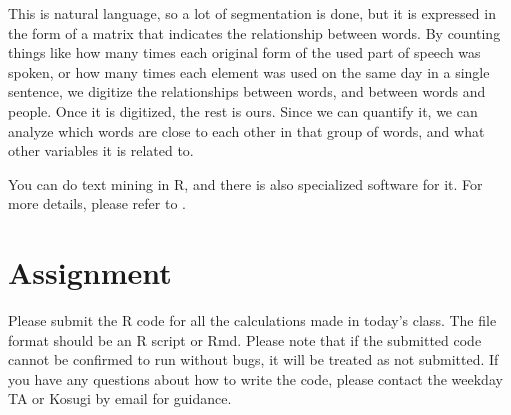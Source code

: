 \documentclass{ltjsbook}
\begin{document}
This is natural language, so a lot of segmentation is done, but it is expressed in the form of a matrix that indicates the relationship between words. By counting things like how many times each original form of the used part of speech was spoken, or how many times each element was used on the same day in a single sentence, we digitize the relationships between words, and between words and people.
Once it is digitized, the rest is ours. Since we can quantify it, we can analyze which words are close to each other in that group of words, and what other variables it is related to.

You can do text mining in R, and there is also specialized software for it. For more details, please refer to \textcite{Higuchu20200406}.


\section{Assignment}
Please submit the R code for all the calculations made in today's class. The file format should be an R script or Rmd. Please note that if the submitted code cannot be confirmed to run without bugs, it will be treated as not submitted. If you have any questions about how to write the code, please contact the weekday TA or Kosugi by email for guidance.
\end{document}
